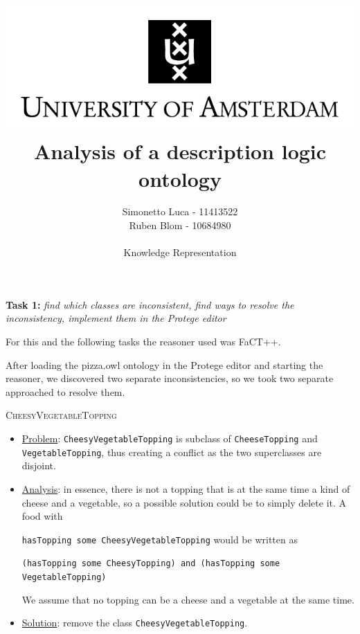 \documentclass[12pt]{article}
\newcommand{\vrbsome}{{\color{magenta}some }}
\newcommand{\vrband}{{\color{cyan}and }}
\begin{document}
\title{\includegraphics[scale=1.3]{./UvA-logo.jpg}\\ Analysis of a description logic ontology}
\author{
Simonetto Luca - 11413522\\
Ruben Blom - 10684980\\
\begin{normalsize}
Knowledge Representation
\end{normalsize}}
 
\maketitle

\textbf{Task 1:} \textit{find which classes are inconsistent, find ways to resolve the inconsistency, implement them in the Protege editor}

For this and the following tasks the reasoner used was FaCT++.

After loading the pizza.owl ontology in the Protege editor and starting the reasoner, we discovered two separate inconsistencies, so we took two separate approached to resolve them.

\textsc{CheesyVegetableTopping}
\begin{itemize}
\item{\underline{Problem}: \texttt{CheesyVegetableTopping} is subclass of \texttt{CheeseTopping} and \texttt{VegetableTopping}, thus creating a conflict as the two superclasses are disjoint.} 

\item{\underline{Analysis}: in essence, there is not a topping that is at the same time a kind of cheese and a vegetable, so a possible solution could be to simply delete it. A food with

\texttt{hasTopping \vrbsome CheesyVegetableTopping} would be written as 

\texttt{(hasTopping \vrbsome CheesyTopping) \vrband (hasTopping \vrbsome VegetableTopping)}

We assume that no topping can be a cheese and a vegetable at the same time.}

\item{\underline{Solution}: remove the class \texttt{CheesyVegetableTopping}.}
\end{itemize}
\end{document}
